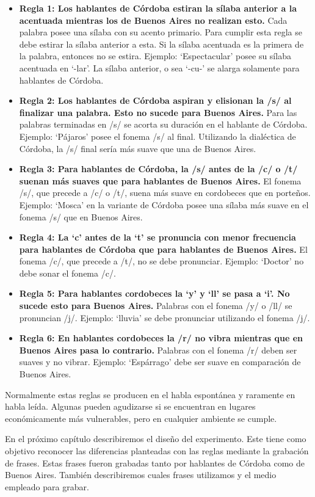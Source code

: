 \begin{itemize}

\item \textbf{Regla 1: Los hablantes de Córdoba estiran la sílaba anterior a la acentuada mientras los de Buenos Aires no realizan esto.} Cada palabra posee una sílaba con su acento primario. Para cumplir esta regla se debe estirar la sílaba anterior a esta. Si la sílaba acentuada es la primera de la palabra, entonces no se estira. Ejemplo: `Espectacular' posee su sílaba acentuada en `-lar'. La sílaba anterior, o sea `-cu-' se alarga solamente para hablantes de Córdoba. 

\item \textbf{Regla 2: Los hablantes de Córdoba aspiran y elisionan la /s/ al finalizar una palabra. Esto no sucede para Buenos Aires.} Para las palabras terminadas en /s/ se acorta su duración en el hablante de Córdoba. Ejemplo: `Pájaros' posee el fonema /s/ al final. Utilizando la dialéctica de Córdoba, la /s/ final sería más suave que una de Buenos Aires. 

\item \textbf{Regla 3: Para hablantes de Córdoba, la /s/ antes de la /c/ o /t/ suenan más suaves que para hablantes de Buenos Aires.} El fonema /s/, que precede a /c/ o /t/, suena más suave en cordobeces que en porteños. Ejemplo: `Mosca' en la variante de Córdoba posee una sílaba más suave en el fonema /s/ que en Buenos Aires. 

\item \textbf{Regla 4: La `c' antes de la `t' se pronuncia con menor frecuencia para hablantes de Córdoba que para hablantes de Buenos Aires.} El fonema /c/, que precede a /t/, no se debe pronunciar. Ejemplo: `Doctor' no debe sonar el fonema /c/.

\item \textbf{Regla 5: Para hablantes cordobeces la `y’ y `ll’ se pasa a `i’. No sucede esto para Buenos Aires.} Palabras con el fonema /y/ o /ll/ se pronuncian /j/. Ejemplo: `lluvia' se debe pronunciar utilizando el fonema /j/. 

\item \textbf{Regla 6: En hablantes cordobeces la /r/ no vibra mientras que en Buenos Aires pasa lo contrario.} Palabras con el fonema /r/ deben ser suaves y no vibrar. Ejemplo: `Espárrago' debe ser suave en comparación de Buenos Aires. 

\end{itemize}

Normalmente estas reglas se producen en el habla espontánea y raramente en habla leída. Algunas pueden agudizarse si se encuentran en lugares económicamente más vulnerables, pero en cualquier ambiente se cumple.

En el próximo capítulo describiremos el diseño del experimento. Este tiene como objetivo reconocer las diferencias planteadas con las reglas mediante la grabación de frases. Estas frases fueron grabadas tanto por hablantes de Córdoba como de Buenos Aires. También describiremos cuales frases utilizamos y el medio empleado para grabar.
